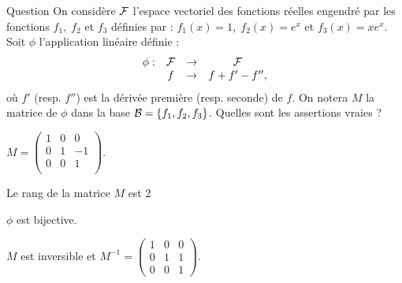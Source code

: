 \begin{multi}[multiple,feedback=
{La matrice de \(\phi\) d'une base \( {\cal {B}}=(u_j)\) dans une base \( {\cal {B}}'=(v_i)\) est la matrice  dont la \(j\)ième colonne est constituée des coordonnées de \(\phi(u_j)\) dans la base \( {\cal {B}}'\). Donc
\[M= \left(\begin{array}{rcc}
1&0&0\\0&1&-1\\ 0&0&1\end{array}\right).\]
Le rang d'une matrice est le nombre maximum de vecteurs colonnes ou lignes linéairement indépendants. Donc le rang de \(M\) est \(3\). Par conséquent, \(\phi\) est bijective et \(M\) est inversible. On vérifie que 
\(M^{-1} = \left(\begin{array}{rcc}1&0&0\\
0&1&1\\ 0&0&1\end{array}\right)\).
}]{Question}
On considère \({\cal F}\) l'espace vectoriel des fonctions réelles engendré par les fonctions \(f_1, \; f_2\) et  \(f_3\) définies par  : 
\(f_1(x)=1, \; f_2(x)=e^x\) et  \(f_3(x)=xe^x\). Soit \(\phi\) l'application linéaire définie : 
\[\begin{array}{rccc}\phi:& {\cal F}&\to& {\cal F}\\
& f&\to &f+f'-f'',  \end{array}\]
où \(f'\) (resp. \(f''\)) est la dérivée première (resp. seconde) de \(f\). On notera \(M\) la matrice de \(\phi\) dans la base \({\cal B}=\{f_1, f_2,f_3\}\). Quelles sont les assertions vraies ?

    \item* \(M=\left(\begin{array}{rcc}
1&0&0\\0&1&-1\\
0&0&1\\\end{array}\right)\).
    \item Le rang de la matrice \(M\) est \(2\)
    \item* \(\phi \) est bijective.
    \item* \(M\) est inversible et \(M^{-1} =
\left(\begin{array}{rcc}1&0&0\\0&1&1\\ 0&0&1\end{array}\right)\).
\end{multi}


